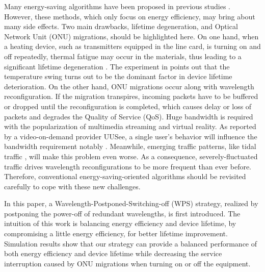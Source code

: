 \documentclass[letter]{IEEEtran}
\begin{document}
Many energy-saving algorithms have been proposed in previous studies \cite{6069715,6320604,7249119}. However, these methods, which only focus on energy efficiency, may bring about many side effects. Two main drawbacks, lifetime degeneration, and Optical Network Unit (ONU) migrations, should be highlighted here. On one hand, when a heating device, such as transmitters equipped in the line card, is turning on and off repeatedly, thermal fatigue may occur in the materials, thus leading to a significant lifetime degeneration \cite{kressel2006semiconductor}. The experiment in \cite{schulz2012thermal} points out that the temperature swing turns out to be the dominant factor in device lifetime deterioration. On the other hand, ONU migrations occur along with wavelength reconfiguration. If the migration transpires, incoming packets have to be buffered or dropped until the reconfiguration is completed, which causes delay or loss of packets and degrades the Quality of Service (QoS). Huge bandwidth is required with the popularization of multimedia streaming and virtual reality. As reported by a video-on-demand provider UUSee, a single user's behavior will influence the bandwidth requirement notably \cite{6195785}. Meanwhile, emerging traffic patterns, like tidal traffic \cite{7444562}, will make this problem even worse.  As a consequence, severely-fluctuated traffic drives wavelength reconfigurations to be more frequent than ever before. Therefore, conventional energy-saving-oriented algorithms should be revisited carefully to cope with these new challenges.

In this paper, a Wavelength-Postponed-Switching-off (WPS) strategy, realized by postponing the power-off of redundant wavelengths, is first introduced. The intuition of this work is balancing energy efficiency and device lifetime, by compromising a little energy efficiency, for better lifetime improvement. Simulation results show that our strategy can provide a balanced performance of both energy efficiency and device lifetime while decreasing the service interruption caused by ONU migrations when turning on or off the equipment.


 


\end{document}
